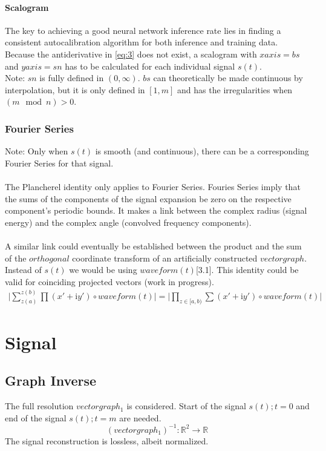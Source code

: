 \documentclass{report}
\begin{document}
\subsubsection{Scalogram}
The key to achieving a good neural network inference rate lies in finding a consistent autocalibration algorithm for both inference and training data. Because the antiderivative in \eqref{eq:3} does not exist, a scalogram with $xaxis=bs$ and $yaxis=sn$ has to be calculated for each individual signal $s(t)$.\\
Note: $sn$ is fully defined in $(0,\infty)$. $bs$ can theoretically be made continuous by interpolation, but it is only defined in $[1,m]$ and has the irregularities when $(m\mod n) > 0$.


\subsection*{Fourier Series}
Note: Only when $s(t)$ is smooth (and continuous), there can be a corresponding Fourier Series for that signal.\\\\
The Plancherel identity only applies to Fourier Series. Fouries Series imply that the sums of the components of the signal expansion be zero on the respective component's periodic bounds. It makes a link between the complex radius (signal energy) and the complex angle (convolved frequency components).\\\\
A similar link could eventually be established between the product and the sum of the $orthogonal$ coordinate transform of an artificially constructed $vectorgraph$. Instead of $s(t)$ we would be using $waveform(t)$\cite{Grapher}[3.1]. This identity could be valid for coinciding projected vectors (work in progress).
\begin{align}
\vert \sum \limits _{z(a)}^{z(b)} \prod (x'+\mathrm{i}y')\circ waveform(t) \vert=\vert \prod \limits _{z \in [a,b)} \sum (x'+\mathrm{i}y')\circ waveform(t) \vert
\end{align}

\chapter{Signal}
\section{Graph Inverse}
The full resolution $vectorgraph_{1}$ is considered. Start of the signal $s(t);t=0$ and end of the signal $s(t);t=m$ are needed.
\begin{equation}
(vectorgraph_{1})^{-1}: \mathbb{R}^2 \rightarrow \mathbb{R}
\end{equation}
The signal reconstruction is lossless, albeit normalized.
\end{document}
